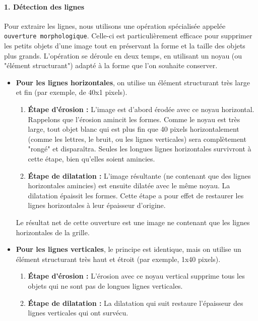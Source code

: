 \documentclass{article}
\begin{document}
\paragraph{1. Détection des lignes}
Pour extraire les lignes, nous utilisons une opération spécialisée appelée \texttt{ouverture morphologique}. Celle-ci est particulièrement efficace pour supprimer les petits objets d'une image tout en préservant la forme et la taille des objets plus grands. L'opération se déroule en deux temps, en utilisant un noyau (ou "élément structurant") adapté à la forme que l'on souhaite conserver.

\begin{itemize}
    \item \textbf{Pour les lignes horizontales}, on utilise un élément structurant très large et fin (par exemple, de 40x1 pixels).
    \begin{enumerate}
        \item \textbf{Étape d'érosion :} L'image est d'abord érodée avec ce noyau horizontal. Rappelons que l'érosion amincit les formes. Comme le noyau est très large, tout objet blanc qui est plus fin que 40 pixels horizontalement (comme les lettres, le bruit, ou les lignes verticales) sera complètement "rongé" et disparaîtra. Seules les longues lignes horizontales survivront à cette étape, bien qu'elles soient amincies.
        \item \textbf{Étape de dilatation :} L'image résultante (ne contenant que des lignes horizontales amincies) est ensuite dilatée avec le même noyau. La dilatation épaissit les formes. Cette étape a pour effet de restaurer les lignes horizontales à leur épaisseur d'origine.
    \end{enumerate}
    Le résultat net de cette ouverture est une image ne contenant que les lignes horizontales de la grille.

    \item \textbf{Pour les lignes verticales}, le principe est identique, mais on utilise un élément structurant très haut et étroit (par exemple, 1x40 pixels).
    \begin{enumerate}
        \item \textbf{Étape d'érosion :} L'érosion avec ce noyau vertical supprime tous les objets qui ne sont pas de longues lignes verticales.
        \item \textbf{Étape de dilatation :} La dilatation qui suit restaure l'épaisseur des lignes verticales qui ont survécu.
    \end{enumerate}
\end{itemize}
\end{document}

